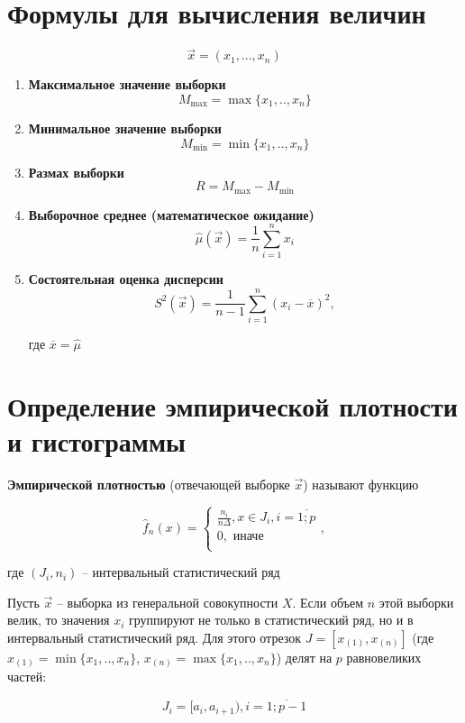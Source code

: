 \chapter{Формулы для вычисления величин}

$$\vec x=(x_1, ..., x_n)$$

\begin{enumerate}
	\item \textbf{Максимальное значение выборки}
	$$M_{\max} = \max\{x_1, .., x_n\}$$
	\item \textbf{Минимальное значение выборки}
	$$M_{\min} = \min\{x_1, .., x_n\}$$
	\item \textbf{Размах выборки}
	$$R = M_{\max} - M_{\min}$$
	\item \textbf{Выборочное среднее (математическое ожидание)}
	$$\hat \mu(\vec x) = \frac{1}{n} \sum_{i=1}^n x_i$$
	\item \textbf{Состоятельная оценка дисперсии}
	$$S^2 (\vec x) = \frac{1}{n-1} \sum_{i=1}^n (x_i - \overline x)^2,$$
	
	где $ \overline{x} = \hat \mu $
\end{enumerate}

\chapter{Определение эмпирической плотности и гистограммы}

\textbf{Эмпирической плотностью} (отвечающей выборке $\vec x$) называют функцию

\begin{equation*}
	\hat f_n(x) =
	\begin{cases}
		\frac{n_i}{n \Delta}, x \in J_i, i = \overline{1; p} \\
		0, \text{ иначе} \\
	\end{cases},
\end{equation*}

где $(J_i, n_i)$ -- интервальный статистический ряд

\hfill

Пусть $\vec x$ -- выборка из генеральной совокупности $X$. Если объем $n$ этой выборки велик, то значения $x_i$ группируют не только в статистический ряд, но и в интервальный статистический ряд. Для этого отрезок
$J = [x_{(1)}, x_{(n)}]$ (где $x_{(1)}=\min\{x_1,..,x_n\}$, $x_{(n)}=\max\{x_1,..,x_n\}$) делят на $p$ равновеликих частей:

\begin{equation*}
	J_i = [a_i, a_{i+1}), i = \overline{1; p - 1}
\end{equation*}


